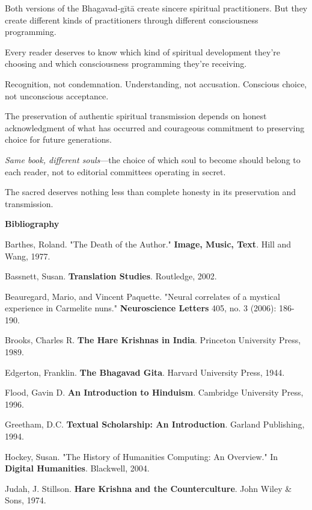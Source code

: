 \documentclass[11pt,twoside]{book}
\begin{document}
Both versions of the Bhagavad-gītā create sincere spiritual practitioners. But they create different kinds of practitioners through different consciousness programming.

Every reader deserves to know which kind of spiritual development they're choosing and which consciousness programming they're receiving.

Recognition, not condemnation. Understanding, not accusation. Conscious choice, not unconscious acceptance.

The preservation of authentic spiritual transmission depends on honest acknowledgment of what has occurred and courageous commitment to preserving choice for future generations.

\textit{Same book, different souls}—the choice of which soul to become should belong to each reader, not to editorial committees operating in secret.

The sacred deserves nothing less than complete honesty in its preservation and transmission.

\clearpage
\pagestyle{sectionopening}
\thispagestyle{sectionopening}
\markboth{}{}
\markright{}
\vspace*{0.25\textheight}
\begin{center}
{\Huge\bfseries Bibliography}
\end{center}
\newpage

Barthes, Roland. "The Death of the Author." \textbf{Image, Music, Text}. Hill and Wang, 1977.

Bassnett, Susan. \textbf{Translation Studies}. Routledge, 2002.

Beauregard, Mario, and Vincent Paquette. "Neural correlates of a mystical experience in Carmelite nuns." \textbf{Neuroscience Letters} 405, no. 3 (2006): 186-190.

Brooks, Charles R. \textbf{The Hare Krishnas in India}. Princeton University Press, 1989.

Edgerton, Franklin. \textbf{The Bhagavad Gita}. Harvard University Press, 1944.

Flood, Gavin D. \textbf{An Introduction to Hinduism}. Cambridge University Press, 1996.

Greetham, D.C. \textbf{Textual Scholarship: An Introduction}. Garland Publishing, 1994.

Hockey, Susan. "The History of Humanities Computing: An Overview." In \textbf{Digital Humanities}. Blackwell, 2004.

Judah, J. Stillson. \textbf{Hare Krishna and the Counterculture}. John Wiley \& Sons, 1974.
\end{document}
